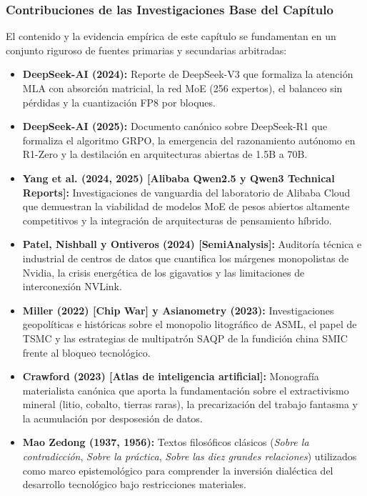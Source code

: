 \subsubsection*{Contribuciones de las Investigaciones Base del Capítulo}
El contenido y la evidencia empírica de este capítulo se fundamentan en un conjunto riguroso de fuentes primarias y secundarias arbitradas:
\begin{itemize}[leftmargin=1.5em, itemsep=0.25em]
    \item \textbf{DeepSeek-AI (2024):} Reporte de DeepSeek-V3 que formaliza la atención MLA con absorción matricial, la red MoE (256 expertos), el balanceo sin pérdidas y la cuantización FP8 por bloques.
    \item \textbf{DeepSeek-AI (2025):} Documento canónico sobre DeepSeek-R1 que formaliza el algoritmo GRPO, la emergencia del razonamiento autónomo en R1-Zero y la destilación en arquitecturas abiertas de 1.5B a 70B.
    \item \textbf{Yang et al. (2024, 2025) [Alibaba Qwen2.5 y Qwen3 Technical Reports]:} Investigaciones de vanguardia del laboratorio de Alibaba Cloud que demuestran la viabilidad de modelos MoE de pesos abiertos altamente competitivos y la integración de arquitecturas de pensamiento híbrido.
    \item \textbf{Patel, Nishball y Ontiveros (2024) [SemiAnalysis]:} Auditoría técnica e industrial de centros de datos que cuantifica los márgenes monopolistas de Nvidia, la crisis energética de los gigavatios y las limitaciones de interconexión NVLink.
    \item \textbf{Miller (2022) [Chip War] y Asianometry (2023):} Investigaciones geopolíticas e históricas sobre el monopolio litográfico de ASML, el papel de TSMC y las estrategias de multipatrón SAQP de la fundición china SMIC frente al bloqueo tecnológico.
    \item \textbf{Crawford (2023) [Atlas de inteligencia artificial]:} Monografía materialista canónica que aporta la fundamentación sobre el extractivismo mineral (litio, cobalto, tierras raras), la precarización del trabajo fantasma y la acumulación por desposesión de datos.
    \item \textbf{Mao Zedong (1937, 1956):} Textos filosóficos clásicos (\textit{Sobre la contradicción}, \textit{Sobre la práctica}, \textit{Sobre las diez grandes relaciones}) utilizados como marco epistemológico para comprender la inversión dialéctica del desarrollo tecnológico bajo restricciones materiales.
\end{itemize}
\vspace{0.3cm}

